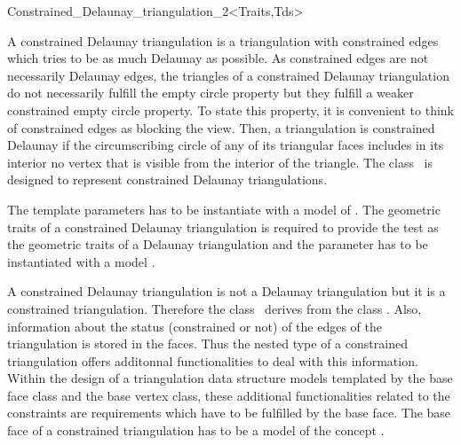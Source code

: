 

\begin{ccRefClass}{Constrained_Delaunay_triangulation_2<Traits,Tds>}  %


\ccDefinition
A constrained Delaunay triangulation is a triangulation with
constrained edges which tries to be as much Delaunay as possible.
As constrained edges are not necessarily Delaunay edges,
the triangles of a constrained Delaunay triangulation do not
necessarily fulfill the empty circle property
but they fulfill a weaker constrained empty circle property.
 To state this property,
it is convenient to think of  constrained
edges as blocking the view. Then, a triangulation is 
constrained Delaunay if
 the circumscribing circle
of any of its triangular faces includes in its interior 
no vertex  that is visible
from the interior of the triangle.  
The class \ccRefName\ is designed to represent
constrained Delaunay triangulations.

The template parameters  
has to be instantiate with a model of .
The geometric traits 
of a constrained Delaunay triangulation is required
to provide the  test as the geometric traits
of a Delaunay triangulation and the 
parameter has 
to be instantiated with a model
.

A constrained Delaunay triangulation is not a Delaunay
triangulation but it is a constrained triangulation.
Therefore the class \ccRefName\ derives from
the class .
Also, information about the status (constrained or not)
of the edges of the triangulation is stored
in the faces. 
Thus the nested 
type of a constrained triangulation offers
additonnal functionalities to deal with this information.
Within the design of a triangulation data structure
models templated by the base face class and the base vertex class,
these additional functionalities related to the constraints
are requirements which have to be fulfilled
by the base face.
The base face of a constrained triangulation
has to be a model of the concept
.


\end{ccRefClass}
